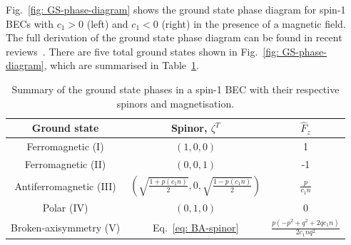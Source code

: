 Fig.~\ref{fig: GS-phase-diagram} shows the ground state phase diagram for spin-1
BECs with \(c_1 > 0\) (left) and \(c_1 < 0\) (right) in the presence of a
magnetic field.
The full derivation of the ground state phase diagram can be found in recent
reviews~\cite{Kawaguchi2012, Stamper-Kurn2013}.
There are five total ground states shown in Fig.~\ref{fig: GS-phase-diagram},
which are summarised in Table~\ref{tab: spin-1-ground-states}.
\begin{table}
    \centering
    \begin{tabular}{ccc}
        \toprule
        Ground state & Spinor, \(\zeta^T\) & \(\hat{F}_z\) \\
        \midrule
        Ferromagnetic (I) & \((1, 0, 0)\) & 1 \\
        Ferromagnetic (II) & \((0, 0, 1)\) & -1 \\
        Antiferromagnetic (III) & \(\left(\sqrt{\frac{1 + p(c_1n)}{2}}, 0,
        \sqrt{\frac{1 - p(c_1n)}{2}}\right)\) & \(\frac{p}{c_1n}\) \\
        Polar (IV) & \((0, 1, 0)\) & 0 \\
        Broken-axisymmetry (V) & Eq.~\eqref{eq: BA-spinor} &
        \(\frac{p(-p^2+q^2+2qc_1n)}{2c_1nq^2}\) \\
        \bottomrule
    \end{tabular}
    \caption[Ground states arising in spin-1 BECs]
    {\label{tab: spin-1-ground-states}Summary of the ground state phases in a
    spin-1 BEC with their respective spinors and magnetisation.}
\end{table}

